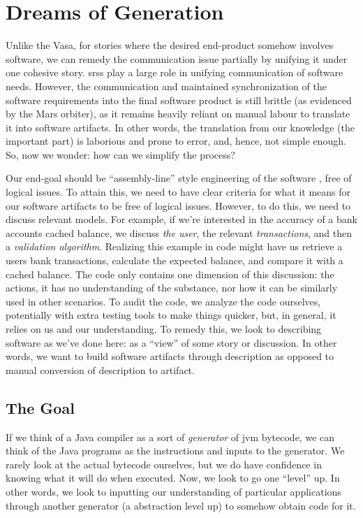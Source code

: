 \section{Dreams of Generation}
\label{chap:ideology:sec:thoughts_of_generation}

Unlike the Vasa, for stories where the desired end-product somehow involves
software, we can remedy the communication issue partially by unifying it under
one cohesive story. \Acfp{srs} play a large role in unifying communication of
software needs. However, the communication and maintained synchronization of the
software requirements into the final software product is still brittle (as
evidenced by the Mars orbiter), as it remains heavily reliant on manual labour
to translate it into software artifacts. In other words, the translation from
our knowledge (the important part) is laborious and prone to error, and, hence,
not simple enough. So, now we wonder: how can we simplify the process?

Our end-goal should be ``assembly-line'' style engineering of the software
\cite{well-understood}, free of logical issues. To attain this, we need to have
clear criteria for what it means for our software artifacts to be free of
logical issues. However, to do this, we need to discuss relevant models. For
example, if we're interested in the accuracy of a bank accounts cached balance,
we discuss \textit{the user}, the relevant \textit{transactions}, and then a
\textit{validation algorithm}. Realizing this example in code might have us
retrieve a users bank transactions, calculate the expected balance, and compare
it with a cached balance. The code only contains one dimension of this
discussion: the actions, it has no understanding of the substance, nor how it
can be similarly used in other scenarios. To audit the code, we analyze the code
ourselves, potentially with extra testing tools to make things quicker, but, in
general, it relies on us and our understanding. To remedy this, we look to
describing software as we've done here: as a ``view'' of some story or
discussion. In other words, we want to build software artifacts through
description as opposed to manual conversion of description to artifact.

\subsection{The Goal}
\label{chap:ideology:sec:thoughts_of_generation:subsec:the_goal}

If we think of a Java compiler as a sort of \textit{generator} of \acs{jvm}
bytecode, we can think of the Java programs as the instructions and inputs to
the generator. We rarely look at the actual bytecode ourselves, but we do have
confidence in knowing what it will do when executed. Now, we look to go one
``level'' up. In other words, we look to inputting our understanding of
particular applications through another generator (a abstraction level up) to
somehow obtain code for it.

